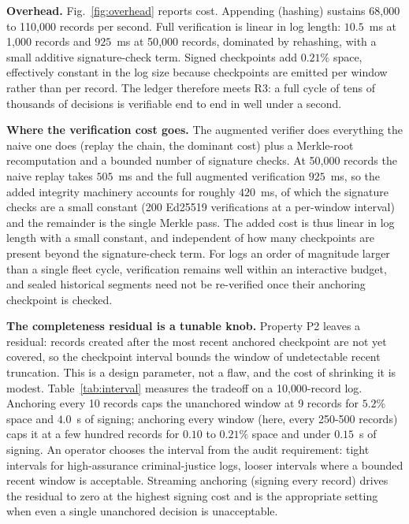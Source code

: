 \documentclass[journal]{IEEEtran}
\begin{document}
\textbf{Overhead.} Fig.~\ref{fig:overhead} reports cost. Appending (hashing)
sustains 68{,}000 to 110{,}000 records per second. Full verification is
linear in log length: $10.5$~ms at 1{,}000 records and $925$~ms at
50{,}000 records, dominated by rehashing, with a small additive
signature-check term. Signed checkpoints add $0.21\%$ space, effectively
constant in the log size because checkpoints are emitted per window rather
than per record. The ledger therefore meets R3: a full cycle of tens of
thousands of decisions is verifiable end to end in well under a second.

\textbf{Where the verification cost goes.} The augmented verifier does
everything the naive one does (replay the chain, the dominant cost) plus a
Merkle-root recomputation and a bounded number of signature checks. At
50{,}000 records the naive replay takes $505$~ms and the full augmented
verification $925$~ms, so the added integrity machinery accounts for roughly
$420$~ms, of which the signature checks are a small constant (200 Ed25519
verifications at a per-window interval) and the remainder is the single
Merkle pass. The added cost is thus linear in log length with a small
constant, and independent of how many checkpoints are present beyond the
signature-check term. For logs an order of magnitude larger than a single
fleet cycle, verification remains well within an interactive budget, and
sealed historical segments need not be re-verified once their anchoring
checkpoint is checked.

\textbf{The completeness residual is a tunable knob.} Property P2 leaves a
residual: records created after the most recent anchored checkpoint are not
yet covered, so the checkpoint interval bounds the window of undetectable
recent truncation. This is a design parameter, not a flaw, and the cost of
shrinking it is modest. Table~\ref{tab:interval} measures the tradeoff on a
10{,}000-record log. Anchoring every 10 records caps the unanchored window at
9 records for $5.2\%$ space and $4.0$~s of signing; anchoring every window
(here, every 250-500 records) caps it at a few hundred records for $0.10$ to
$0.21\%$ space and under $0.15$~s of signing. An operator chooses the
interval from the audit requirement: tight intervals for high-assurance
criminal-justice logs, looser intervals where a bounded recent window is
acceptable. Streaming anchoring (signing every record) drives the residual
to zero at the highest signing cost and is the appropriate setting when even
a single unanchored decision is unacceptable.
\end{document}
